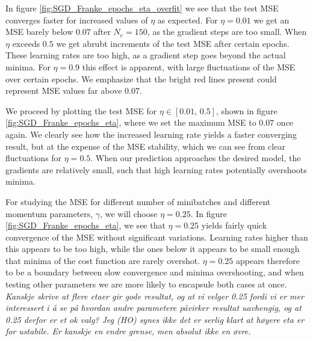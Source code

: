 \documentclass[12pt]{extarticle}
\begin{document}
In figure \ref{fig:SGD_Franke_epochs_eta_overfit} we see that the test MSE converges faster for increased values of $\eta$ as expected. For $\eta=0.01$ we get an MSE barely below $0.07$ after $N_e=150$, as the gradient steps are too small. When $\eta$ exceeds $0.5$ we get abrubt increments of the test MSE after certain epochs. These learning rates are too high, as a gradient step goes beyond the actual minima. For $\eta=0.9$ this effect is apparent, with large fluctuations of the MSE over certain epochs. We emphasize that the bright red lines present could represent MSE values far above $0.07$.

We proceed by plotting the test MSE for $\eta\in[0.01,\,0.5]$, shown in figure \ref{fig:SGD_Franke_epochs_eta}, where we set the maximum MSE to $0.07$ once again. We clearly see how the increased learning rate yields a faster converging result, but at the expense of the MSE stability, which we can see from clear fluctuations for $\eta=0.5$. When our prediction approaches the desired model, the gradients are relatively small, such that high learning rates potentially overshoots minima.

For studying the MSE for different number of minibatches and different momentum parameters, $\gamma$, we will choose $\eta=0.25$. In figure \ref{fig:SGD_Franke_epochs_eta}, we see that $\eta=0.25$ yields fairly quick convergence of the MSE without significant variations. Learning rates higher than this appears to be too high, while the ones below it appears to be small enough that minima of the cost function are rarely overshot. $\eta=0.25$ appears therefore to be a boundary between slow convergence and minima overshooting, and when testing other parameters we are more likely to encapsule both cases at once.
\textit{Kanskje skrive at flere etaer gir gode resultat, og at vi velger 0.25 fordi vi er mer interessert i å se på hvordan andre parametere påvirker resultat uavhengig, og at 0.25 derfor er et ok valg? Jeg (HO) synes ikke det er serlig klart at høyere eta er for ustabile. Er kanskje en endre grense, men absolut ikke en øvre.}
\end{document}
